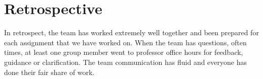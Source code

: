 \documentclass[10pt,letterpaper,onecolumn,draftclsnofoot]{IEEEtran}
\begin{document}
\section{Retrospective}
In retrospect, the team has worked extremely well together and been prepared for each assignment that we have worked on. When the team has questions, often times, at least one group member went to professor office hours for feedback, guidance or clarification. The team communication has fluid and everyone has done their fair share of work. 
\end{document}
